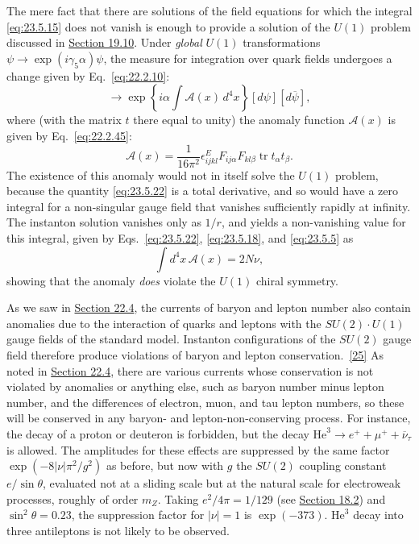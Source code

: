 The mere fact that there are solutions of the field equations for which
the integral \eqref{eq:23.5.15} does not vanish is enough to provide a
solution of the $U(1)$ problem discussed in \hyperref[sec:19.10]{Section 19.10}. Under
\emph{global} $U(1)$ transformations
$\psi\to\exp(i\gamma_5\alpha)\psi$, the measure for integration over
quark fields undergoes a change given by Eq.~\eqref{eq:22.2.10}:
\begin{equation}
[d\psi][d\overline\psi]\longrightarrow
\exp\left\{i\alpha\int\mathcal A(x)\,d^4x\right\}
[d\psi][d\overline\psi],
\tag{23.5.21}\label{eq:23.5.21}
\end{equation}
where (with the matrix $t$ there equal to unity) the anomaly function
$\mathcal A(x)$ is given by Eq.~\eqref{eq:22.2.45}:
\begin{equation}
\mathcal A(x)=\frac{1}{16\pi^2}\epsilon^E_{ijkl}
F_{ij\alpha}F_{kl\beta}\operatorname{tr}t_\alpha t_\beta.
\tag{23.5.22}\label{eq:23.5.22}
\end{equation}
The existence of this anomaly would not in itself solve the $U(1)$
problem, because the quantity \eqref{eq:23.5.22} is a total derivative,
and so would have a zero integral for a non-singular gauge field that
vanishes sufficiently rapidly at infinity. The instanton solution
vanishes only as $1/r$, and yields a non-vanishing value for this
integral, given by Eqs.~\eqref{eq:23.5.22}, \eqref{eq:23.5.18}, and
\eqref{eq:23.5.5} as
\begin{equation}
\int d^4x\,\mathcal A(x)=2N\nu,
\tag{23.5.23}\label{eq:23.5.23}
\end{equation}
showing that the anomaly \emph{does} violate the $U(1)$ chiral symmetry.

As we saw in \hyperref[sec:22.4]{Section 22.4}, the currents of baryon and lepton number also
contain anomalies due to the interaction of quarks and leptons with the
$SU(2)\cdot U(1)$ gauge fields of the standard model. Instanton
configurations of the $SU(2)$ gauge field therefore produce violations
of baryon and lepton conservation.~\hyperref[ch23-ref-25]{[25]} As noted
in \hyperref[sec:22.4]{Section 22.4}, there are various currents whose conservation is not
violated by anomalies or anything else, such as baryon number minus
lepton number, and the differences of electron, muon, and tau lepton
numbers, so these will be conserved in any baryon- and
lepton-non-conserving process. For instance, the decay of a proton or
deuteron is forbidden, but the decay
$\mathrm{He}^3\to e^++\mu^++\overline\nu_\tau$ is allowed. The
amplitudes for these effects are suppressed by the same factor
$\exp(-8|\nu|\pi^2/g^2)$ as before, but now with $g$ the $SU(2)$
coupling constant $e/\sin\theta$, evaluated not at a sliding scale but at
the natural scale for electroweak processes, roughly of order $m_Z$.
Taking $e^2/4\pi=1/129$ (see \hyperref[sec:18.2]{Section 18.2}) and
$\sin^2\theta=0.23$, the suppression factor for $|\nu|=1$ is
$\exp(-373)$. $\mathrm{He}^3$ decay into three antileptons is not likely
to be observed.

